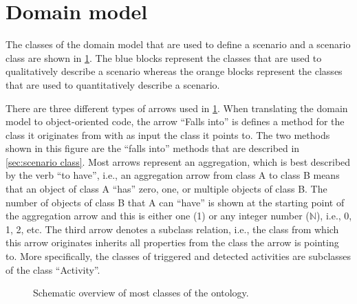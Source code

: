 \section{Domain model}
\label{sec:ontology}


The classes of the domain model that are used to define a scenario and a scenario class are shown in \cref{fig:ontology classes}. The blue blocks represent the classes that are used to qualitatively describe a scenario whereas the orange blocks represent the classes that are used to quantitatively describe a scenario. 

There are three different types of arrows used in \cref{fig:ontology classes}. When translating the domain model to object-oriented code, the arrow ``Falls into'' is defines a method for the class it originates from with as input the class it points to. The two methods shown in this figure are the ``falls into'' methods that are described in \cref{sec:scenario class}. Most arrows represent an aggregation, which is best described by the verb ``to have'', i.e., an aggregation arrow from class A to class B means that an object of class A ``has'' zero, one, or multiple objects of class B. The number of objects of class B that A can ``have'' is shown at the starting point of the aggregation arrow and this is either one (1) or any integer number ($\mathbb{N}$), i.e., 0, 1, 2, etc. The third arrow denotes a subclass relation, i.e., the class from which this arrow originates inherits all properties from the class the arrow is pointing to. More specifically, the classes of triggered and detected activities are subclasses of the class ``Activity''.

\begin{figure}
	\centering
	
	\caption{Schematic overview of most classes of the ontology.}
	\label{fig:ontology classes}
\end{figure}


